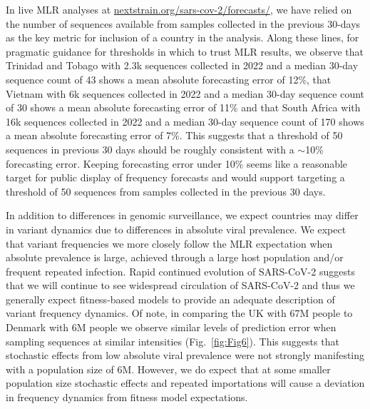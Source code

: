 In live MLR analyses at \href{https://nextstrain.org/sars-cov-2/forecasts/}{nextstrain.org/sars-cov-2/forecasts/}, we have relied on the number of sequences available from samples collected in the previous 30-days as the key metric for inclusion of a country in the analysis.
Along these lines, for pragmatic guidance for thresholds in which to trust MLR results, we observe that Trinidad and Tobago with 2.3k sequences collected in 2022 and a median 30-day sequence count of 43 shows a mean absolute forecasting error of 12\%, that Vietnam with 6k sequences collected in 2022 and a median 30-day sequence count of 30 shows a mean absolute forecasting error of 11\% and that South Africa with 16k sequences collected in 2022 and a median 30-day sequence count of 170 shows a mean absolute forecasting error of 7\%.
This suggests that a threshold of 50 sequences in previous 30 days should be roughly consistent with a $\sim$10\% forecasting error.
Keeping forecasting error under 10\%  seems like a reasonable target for public display of frequency forecasts and would support targeting a threshold of 50 sequences from samples collected in the previous 30 days.

In addition to differences in genomic surveillance, we expect countries may differ in variant dynamics due to differences in absolute viral prevalence.
We expect that variant frequencies we more closely follow the MLR expectation when absolute prevalence is large, achieved through a large host population and/or frequent repeated infection.
Rapid continued evolution of SARS-CoV-2 \cite{kistler2023atlas} suggests that we will continue to see widespread circulation of SARS-CoV-2 and thus we generally expect fitness-based models to provide an adequate description of variant frequency dynamics.
Of note, in comparing the UK with 67M people to Denmark with 6M people we observe similar levels of prediction error when sampling sequences at similar intensities (Fig.~\ref{fig:Fig6}).
This suggests that stochastic effects from low absolute viral prevalence were not strongly manifesting with a population size of 6M.
However, we do expect that at some smaller population size stochastic effects and repeated importations will cause a deviation in frequency dynamics from fitness model expectations.


